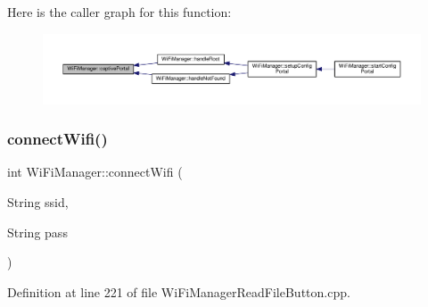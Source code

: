 Here is the caller graph for this function\+:\nopagebreak
\begin{figure}[H]
\begin{center}
\leavevmode
\includegraphics[width=350pt]{d4/dc8/class_wi_fi_manager_a4ef4298deb224212e5242c456669a973_icgraph}
\end{center}
\end{figure}
\mbox{\label{class_wi_fi_manager_ae0ae27b5543b47585728c084c3bbdca7}} 
\subsubsection{\texorpdfstring{connect\+Wifi()}{connectWifi()}}
{\footnotesize\ttfamily int Wi\+Fi\+Manager\+::connect\+Wifi (\begin{DoxyParamCaption}\item[{String}]{ssid,  }\item[{String}]{pass }\end{DoxyParamCaption})\hspace{0.3cm}{\ttfamily [private]}}



Definition at line 221 of file Wi\+Fi\+Manager\+Read\+File\+Button.\+cpp.


